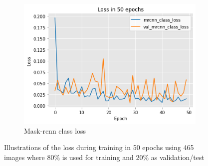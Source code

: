 \documentclass[../Head/Main.tex]{subfiles}
\begin{document}
\begin{figure}[H]
\begin{subfigure}[t]{.32\textwidth}
        \centering
        \includegraphics[width=\textwidth]{../Figures/rcnn_results/loss/plot_smalldata4.png}
        \caption{Mask-rcnn class loss}
        \label{fig:mask_rcnn_class_loss_smalldata}
    \end{subfigure}
    \caption{Illustrations of the loss during training in 50 epochs using 465 images where 80\% is used for training and 20\% as validation/test}
     \label{fig:smalldata_analysis1}
\end{figure}
\end{document}
